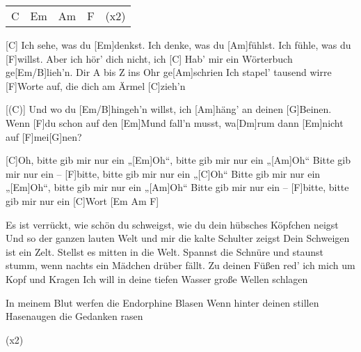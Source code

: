 

\begin{guitar}
	{\footnotesize\begin{tabular}{l|l|l|l l}
			C & Em & Am & F & (x2)
	\end{tabular}}
	
	[C] Ich sehe, was du [Em]denkst. Ich denke, was du [Am]fühlst.
	Ich fühle, was du [F]willst. Aber ich hör' dich nicht, ich
	[C] Hab' mir ein Wörterbuch ge[Em/B]lieh'n. Dir A bis Z ins Ohr ge[Am]schrien
	Ich stapel' tausend wirre [F]Worte auf, die dich am Ärmel [C]zieh'n
	
	[(C)] Und wo du [Em/B]hingeh'n willst, ich [Am]häng' an deinen [G]Beinen.
	Wenn [F]du schon auf den [Em]Mund fall'n musst, wa[Dm]rum dann [Em]nicht auf [F]mei[G]nen?
	
	[C]Oh, bitte gib mir nur ein „[Em]Oh“, bitte gib mir nur ein „[Am]Oh“
	Bitte gib mir nur ein – [F]bitte, bitte gib mir nur ein „[C]Oh“
	Bitte gib mir nur ein „[Em]Oh“, bitte gib mir nur ein „[Am]Oh“
	Bitte gib mir nur ein – [F]bitte, bitte gib mir nur ein [C]Wort [Em Am F]{}
	
	Es ist verrückt, wie schön du schweigst, wie du dein hübsches Köpfchen neigst
	Und so der ganzen lauten Welt und mir die kalte Schulter zeigst
	Dein Schweigen ist ein Zelt. Stellst es mitten in die Welt.
	Spannst die Schnüre und staunst stumm, wenn nachts ein Mädchen drüber fällt.
	Zu deinen Füßen red' ich mich um Kopf und Kragen
	Ich will in deine tiefen Wasser große Wellen schlagen
	
	 
	
	In meinem Blut werfen die Endorphine Blasen
	Wenn hinter deinen stillen Hasenaugen die Gedanken rasen
	
	  (x2)
\end{guitar}